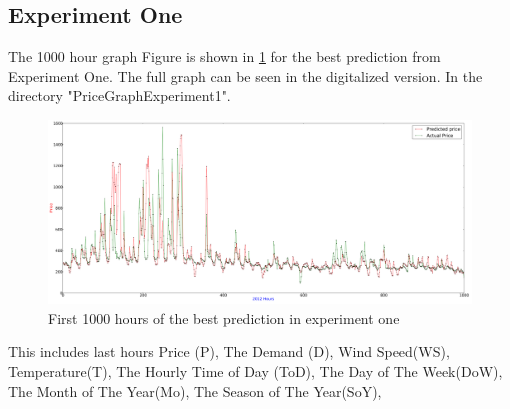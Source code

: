 \subsection{Experiment One}
The 1000 hour graph Figure is shown in \ref{fig:fullPageExperiment1} for the best prediction from Experiment One. The full graph can be seen in the digitalized version. In the directory "PriceGraphExperiment1".

\begin{figure}
\centering
\includegraphics[width=\linewidth]{billeder/PriceGraphs/Experiment1.png}
\caption{First 1000 hours of the best prediction in experiment one}
\label{fig:fullPageExperiment1}
\end{figure}

This includes last hours Price (P), The Demand (D), Wind Speed(WS), Temperature(T), The Hourly Time of Day (ToD), The Day of The Week(DoW), The Month of The Year(Mo), The Season of The Year(SoY),

